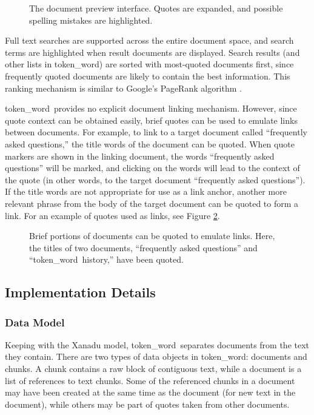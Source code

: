 \documentclass{acm_proc_article-sp}
\newcommand{\tokenWord}{token\_word}
\begin{document}
\begin{figure}[t]
\centering
{}
\caption{The document preview interface.  Quotes are expanded, and possible spelling mistakes are highlighted.}
\label{fig:docPreview}
\end{figure}

Full text searches are supported across the entire document space, and search terms are highlighted when result documents are displayed.
Search results (and other lists in \tokenWord) are sorted with most-quoted documents first, since frequently quoted documents are likely to contain the best information.
This ranking mechanism is similar to Google's PageRank algorithm \cite{Brin1998}. 

\tokenWord \  provides no explicit document linking mechanism.
However, since quote context can be obtained easily, brief quotes can be used to emulate links between documents.
For example, to link to a target document called ``frequently asked questions,'' the title words of the document can be quoted.
When quote markers are shown in the linking document, the words ``frequently asked questions'' will be marked, and clicking on the words will lead to the context of the quote (in other words, to the target document ``frequently asked questions'').
If the title words are not appropriate for use as a link anchor, another more relevant phrase from the body of the target document can be quoted to form a link.
For an example of quotes used as links, see Figure \ref{fig:quotesAsLinks}.

\begin{figure}[t]
\centering
{}
\caption{Brief portions of documents can be quoted to emulate links.  Here, the titles of two documents, ``frequently asked questions'' and ``\tokenWord \  history,'' have been quoted.}
\label{fig:quotesAsLinks}
\end{figure}

\subsection{Implementation Details}

\subsubsection{Data Model}
Keeping with the Xanadu model, \tokenWord \  separates documents from the text they contain.
There are two types of data objects in \tokenWord:  documents and chunks.
A chunk contains a raw block of contiguous text, while a document is a list of references to text chunks.
Some of the referenced chunks in a document may have been created at the same time as the document (for new text in the document), while others may be part of quotes taken from other documents.
\end{document}
